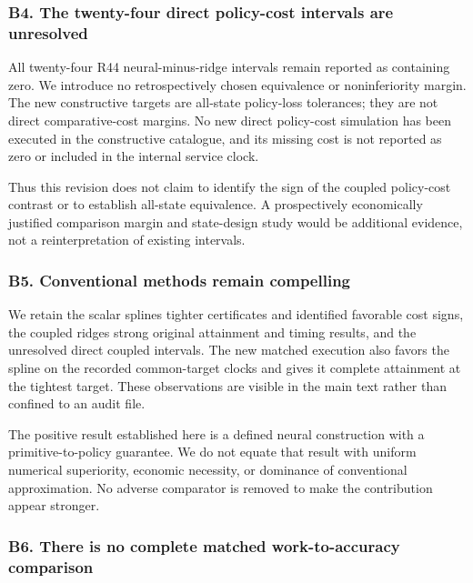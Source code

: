 \documentclass[ecta,nameyear,draft]{econsocart}
\begin{document}
\hypertarget{b4-the-twenty-four-direct-policy-cost-intervals-are-unresolved}{%
\subsubsection{B4. The twenty-four direct policy-cost intervals are
unresolved}\label{b4-the-twenty-four-direct-policy-cost-intervals-are-unresolved}}

All twenty-four R44 neural-minus-ridge intervals remain reported as
containing zero. We introduce no retrospectively chosen equivalence or
noninferiority margin. The new constructive targets are all-state
policy-loss tolerances; they are not direct comparative-cost margins. No
new direct policy-cost simulation has been executed in the constructive
catalogue, and its missing cost is not reported as zero or included in
the internal service clock.

Thus this revision does not claim to identify the sign of the coupled
policy-cost contrast or to establish all-state equivalence. A
prospectively economically justified comparison margin and state-design
study would be additional evidence, not a reinterpretation of existing
intervals.

\hypertarget{b5-conventional-methods-remain-compelling}{%
\subsubsection{B5. Conventional methods remain
compelling}\label{b5-conventional-methods-remain-compelling}}

We retain the scalar spline\textquotesingle s tighter certificates and
identified favorable cost signs, the coupled ridge\textquotesingle s
strong original attainment and timing results, and the unresolved direct
coupled intervals. The new matched execution also favors the spline on
the recorded common-target clocks and gives it complete attainment at
the tightest target. These observations are visible in the main text
rather than confined to an audit file.

The positive result established here is a defined neural construction
with a primitive-to-policy guarantee. We do not equate that result with
uniform numerical superiority, economic necessity, or dominance of
conventional approximation. No adverse comparator is removed to make the
contribution appear stronger.

\hypertarget{b6-there-is-no-complete-matched-work-to-accuracy-comparison}{%
\subsubsection{B6. There is no complete matched work-to-accuracy
comparison}\label{b6-there-is-no-complete-matched-work-to-accuracy-comparison}}
\end{document}
